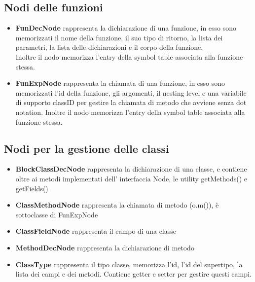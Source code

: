 \documentclass[a4paper]{article}   %
\begin{document}

\subsection{Nodi delle funzioni}
\begin{itemize}
  \item \textbf{FunDecNode} rappresenta la dichiarazione di una funzione, in esso sono memorizzati
  il nome della funzione, il suo tipo di ritorno, la lista dei parametri, la lista delle dichiarazioni e il corpo della funzione.\\
  Inoltre il nodo memorizza l'entry della symbol table associata alla funzione stessa.
  \item \textbf{FunExpNode} rappresenta la chiamata di una funzione, in esso sono memorizzati l'id della funzione,
  gli argomenti, il nesting level e una variabile di supporto classID per gestire la chiamata di metodo che avviene senza dot notation.
  Inoltre il nodo memorizza l'entry della symbol table associata alla funzione stessa.
\end{itemize}

\subsection{Nodi per la gestione delle classi}
\begin{itemize}
  \item \textbf{BlockClassDecNode} rappresenta la dichiarazione di una classe, e contiene oltre ai metodi implementati dell'
  interfaccia Node, le utility getMethods() e getFields()
  \item \textbf{ClassMethodNode} rappresenta la chiamata di metodo (o.m()), è sottoclasse di FunExpNode
  \item \textbf{ClassFieldNode} rappresenta il campo di una classe
  \item \textbf{MethodDecNode} rappresenta la dichiarazione di metodo
  \item \textbf{ClassType} rappresenta il tipo classe, memorizza l'id, l'id del supertipo, la lista dei campi e dei metodi.
  Contiene getter e setter per gestire questi campi.
\end{itemize}
\end{document}
